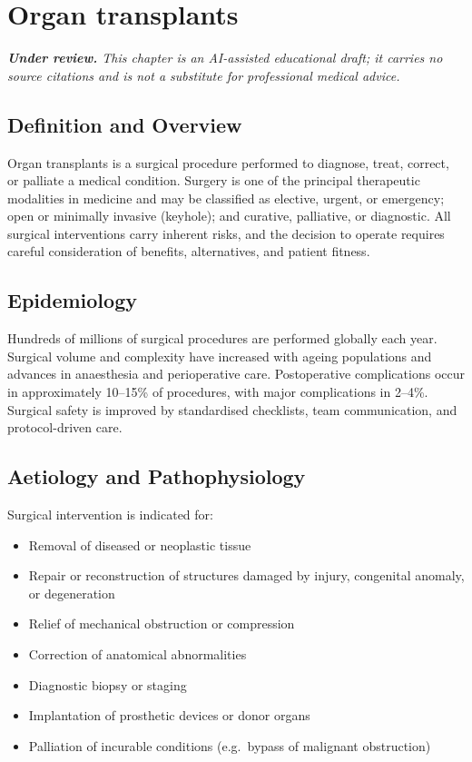 \chapter{Organ transplants}

\medskip
\noindent\textit{\textbf{Under review.} This chapter is an AI-assisted educational draft; it carries no source citations and is not a substitute for professional medical advice.}

\section*{Definition and Overview}
Organ transplants is a surgical procedure performed to diagnose, treat, correct, or palliate a medical condition. Surgery is one of the principal therapeutic modalities in medicine and may be classified as elective, urgent, or emergency; open or minimally invasive (keyhole); and curative, palliative, or diagnostic. All surgical interventions carry inherent risks, and the decision to operate requires careful consideration of benefits, alternatives, and patient fitness.

\section*{Epidemiology}
Hundreds of millions of surgical procedures are performed globally each year. Surgical volume and complexity have increased with ageing populations and advances in anaesthesia and perioperative care. Postoperative complications occur in approximately 10--15\% of procedures, with major complications in 2--4\%. Surgical safety is improved by standardised checklists, team communication, and protocol-driven care.

\section*{Aetiology and Pathophysiology}
Surgical intervention is indicated for:

\begin{itemize}
    \item Removal of diseased or neoplastic tissue
    \item Repair or reconstruction of structures damaged by injury, congenital anomaly, or degeneration
    \item Relief of mechanical obstruction or compression
    \item Correction of anatomical abnormalities
    \item Diagnostic biopsy or staging
    \item Implantation of prosthetic devices or donor organs
    \item Palliation of incurable conditions (e.g.\ bypass of malignant obstruction)
\end{itemize}

